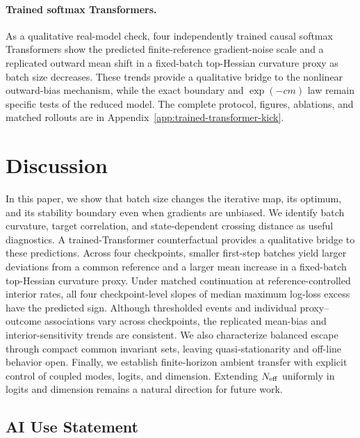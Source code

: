\documentclass[11pt]{article}
\begin{document}
\paragraph{Trained softmax Transformers.}
As a qualitative real-model check, four independently trained causal
softmax Transformers show the predicted finite-reference gradient-noise
scale and a replicated outward mean shift in a fixed-batch top-Hessian
curvature proxy as batch size decreases.  These trends provide a qualitative
bridge to the nonlinear outward-bias mechanism, while the exact boundary and
\(\exp(-cm)\) law remain specific tests of the reduced model.  The complete
protocol, figures, ablations, and matched rollouts are in
Appendix~\ref{app:trained-transformer-kick}.\vspace{-0.1in}

\section{Discussion}
\label{sec:discussion}
\vspace{-0.1in}

In this paper, we show that batch size changes the iterative map, its optimum, and
its stability boundary even when gradients are unbiased. We identify
batch curvature, target correlation, and state-dependent crossing
distance as useful diagnostics. A trained-Transformer counterfactual
provides a qualitative bridge to these predictions. Across four
checkpoints, smaller first-step batches yield larger deviations from a
common reference and a larger mean increase in a fixed-batch top-Hessian
curvature proxy. Under matched continuation at reference-controlled
interior rates, all four checkpoint-level slopes of median maximum
log-loss excess have the predicted sign. Although thresholded events and
individual proxy--outcome associations vary across checkpoints, the
replicated mean-bias and interior-sensitivity trends are consistent.
We also characterize balanced escape through compact common invariant
sets, leaving quasi-stationarity and off-line behavior open. Finally, we
establish finite-horizon ambient transfer with explicit control of coupled
modes, logits, and dimension. Extending \(N_{\rm eff}\) uniformly in logits
and dimension remains a natural direction for future work.

\label{main:end}


\subsection*{AI Use Statement}
\end{document}
